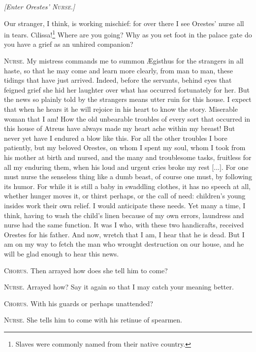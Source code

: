 \documentclass[12pt]{article}
\begin{document}
\begin{center}
\textit{[Enter Orestes' \textsc{Nurse.}]}
\end{center}

Our stranger, I think, is working mischief: for over there I see Orestes' nurse all in tears. Cilissa!\footnote{Slaves were commonly named from their native country.} Where are you going? Why as you set foot in the palace gate do you have a grief as an unhired companion?

\textsc{Nurse.} My mistress commands me to summon {\AE}gisthus for the strangers in all haste, so that he may come and learn more clearly, from man to man, these tidings that have just arrived. Indeed, before the servants, behind eyes that feigned grief she hid her laughter over what has occurred fortunately for her. But the news so plainly told by the strangers means utter ruin for this house. I expect that when he hears it he will rejoice in his heart to know the story. Miserable woman that I am! How the old unbearable troubles of every sort that occurred in this house of Atreus have always made my heart ache within my breast! But never yet have I endured a blow like this. For all the other troubles I bore patiently, but my beloved Orestes, on whom I spent my soul, whom I took from his mother at birth and nursed, and the many and troublesome tasks, fruitless for all my enduring them, when his loud and urgent cries broke my rest [...]. For one must nurse the senseless thing like a dumb beast, of course one must, by following its humor. For while it is still a baby in swaddling clothes, it has no speech at all, whether hunger moves it, or thirst perhaps, or the call of need: children's young insides work their own relief. I would anticipate these needs. Yet many a time, I think, having to wash the child's linen because of my own errors, laundress and nurse had the same function. It was I who, with these two handicrafts, received Orestes for his father. And now, wretch that I am, I hear that he is dead. But I am on my way to fetch the man who wrought destruction on our house, and he will be glad enough to hear this news.

\textsc{Chorus.} Then arrayed how does she tell him to come?

\textsc{Nurse.} Arrayed how? Say it again so that I may catch your meaning better.

\textsc{Chorus.} With his guards or perhaps unattended?

\textsc{Nurse.} She tells him to come with his retinue of spearmen.
\end{document}
